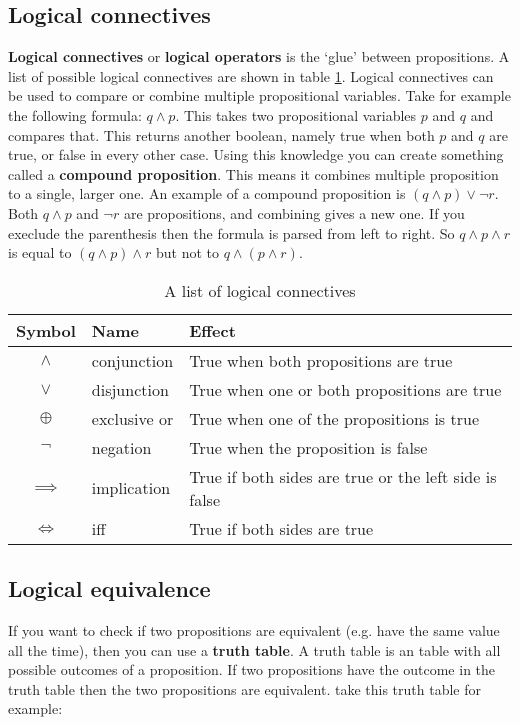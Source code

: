 \subsection{Logical connectives}
{\bf Logical connectives} or {\bf logical operators} is the `glue' between propositions.
A list of possible logical connectives are shown in table \ref{tab:logicalConnectives}.
Logical connectives can be used to compare or combine multiple propositional variables.
Take for example the following formula: \(q \land p\).
This takes two propositional variables \(p\) and \(q\) and compares that.
This returns another boolean, namely true when both \(p\) and \(q\) are true, or false in every other case.
Using this knowledge you can create something called a {\bf compound proposition}.
This means it combines multiple proposition to a single, larger one.
An example of a compound proposition is \((q \land p) \lor \neg r\).
Both \(q \land p\) and \(\neg r\) are propositions, and combining gives a new one.
If you execlude the parenthesis then the formula is parsed from left to right.
So \(q \land p \land r\) is equal to \((q \land p) \land r\) but not to \(q \land (p \land r)\).

\begin{table}[h]
	\centering
	\begin{tabular}{c | l | l}
		Symbol     & Name         & Effect                                                \\
		\hline
		$\land$    & conjunction  & True when both propositions are true                  \\
		$\lor$     & disjunction  & True when one or both propositions are true           \\
		$\oplus$   & exclusive or & True when one of the propositions is true             \\
		$\neg$     & negation     & True when the proposition is false                    \\
		$\implies$ & implication  & True if both sides are true or the left side is false \\
		$\iff$     & iff          & True if both sides are true                           \\
	\end{tabular}
	\caption{A list of logical connectives}
	\label{tab:logicalConnectives}
\end{table}

\subsection{Logical equivalence}
If you want to check if two propositions are equivalent
(e.g. have the same value all the time), then you can use a {\bf truth table}.
A truth table is an table with all possible outcomes of a proposition.
If two propositions have the outcome in the truth table then the two propositions are equivalent.
take this truth table for example:


